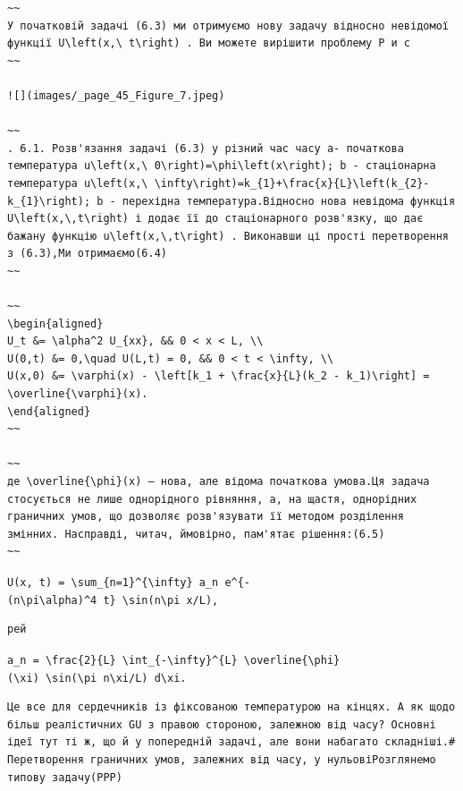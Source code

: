 \documentclass[
  ukrainian,
]{article}
\begin{document}
\begin{verbatim}
~~
У початковій задачі (6.3) ми отримуємо нову задачу відносно невідомої функції U\left(x,\ t\right) . Ви можете вирішити проблему Р и с
~~

![](images/_page_45_Figure_7.jpeg)

~~
. 6.1. Розв'язання задачі (6.3) у різний час часу a- початкова температура u\left(x,\ 0\right)=\phi\left(x\right); b - стаціонарна температура u\left(x,\ \infty\right)=k_{1}+\frac{x}{L}\left(k_{2}-k_{1}\right); b - перехідна температура.Відносно нова невідома функція U\left(x,\,t\right) і додає її до стаціонарного розв'язку, що дає бажану функцію u\left(x,\,t\right) . Виконавши ці прості перетворення з (6.3),Ми отримаємо(6.4)
~~

~~
\begin{aligned}
U_t &= \alpha^2 U_{xx}, && 0 < x < L, \\
U(0,t) &= 0,\quad U(L,t) = 0, && 0 < t < \infty, \\
U(x,0) &= \varphi(x) - \left[k_1 + \frac{x}{L}(k_2 - k_1)\right] = \overline{\varphi}(x).
\end{aligned}
~~

~~
де \overline{\phi}(x) — нова, але відома початкова умова.Ця задача стосується не лише однорідного рівняння, а, на щастя, однорідних граничних умов, що дозволяє розв'язувати її методом розділення змінних. Насправді, читач, ймовірно, пам'ятає рішення:(6.5)
~~
\end{verbatim}

\texttt{U(x,\ t)\ =\ \textbackslash{}sum\_\{n=1\}\^{}\{\textbackslash{}infty\}\ a\_n\ e\^{}\{-(n\textbackslash{}pi\textbackslash{}alpha)\^{}4\ t\}\ \textbackslash{}sin(n\textbackslash{}pi\ x/L),}

\begin{verbatim}
рей
\end{verbatim}

\texttt{a\_n\ =\ \textbackslash{}frac\{2\}\{L\}\ \textbackslash{}int\_\{-\textbackslash{}infty\}\^{}\{L\}\ \textbackslash{}overline\{\textbackslash{}phi\}(\textbackslash{}xi)\ \textbackslash{}sin(\textbackslash{}pi\ n\textbackslash{}xi/L)\ d\textbackslash{}xi.}

\begin{verbatim}
Це все для сердечників із фіксованою температурою на кінцях. А як щодо більш реалістичних GU з правою стороною, залежною від часу? Основні ідеї тут ті ж, що й у попередній задачі, але вони набагато складніші.# Перетворення граничних умов, залежних від часу, у нульовіРозглянемо типову задачу(PPP)
\end{verbatim}
\end{document}
